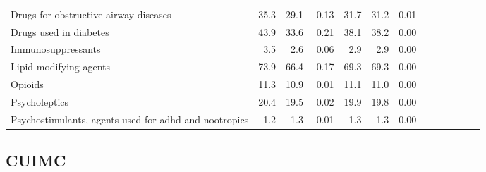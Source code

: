 \documentclass[11pt,]{article}
\begin{document}
\begin{longtable}{lrrrrrrrrrrrr}
      Drugs for obstructive airway diseases & 35.3 & 29.1 &  0.13 & 31.7 & 31.2 &  0.01 \\ 
      Drugs used in diabetes & 43.9 & 33.6 &  0.21 & 38.1 & 38.2 &  0.00 \\ 
      Immunosuppressants &  3.5 &  2.6 &  0.06 &  2.9 &  2.9 &  0.00 \\ 
      Lipid modifying agents & 73.9 & 66.4 &  0.17 & 69.3 & 69.3 &  0.00 \\ 
      Opioids & 11.3 & 10.9 &  0.01 & 11.1 & 11.0 &  0.00 \\ 
      Psycholeptics & 20.4 & 19.5 &  0.02 & 19.9 & 19.8 &  0.00 \\ 
      Psychostimulants, agents used for adhd and nootropics &  1.2 &  1.3 & -0.01 &  1.3 &  1.3 &  0.00 \\ 
   \bottomrule\end{longtable}
\clearpage

\hypertarget{cuimc}{%
\subsection{CUIMC}\label{cuimc}}
\end{document}
